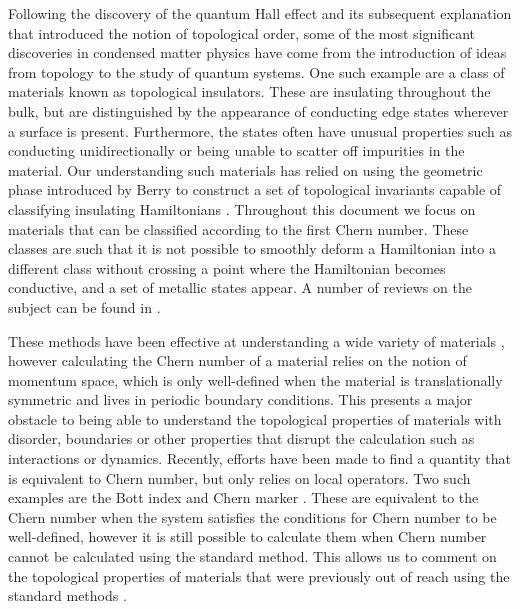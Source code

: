 
Following the discovery of the quantum Hall effect \cite{klitzing_new_1980} and its subsequent explanation \cite{laughlin_quantized_1981,thouless_quantized_1982} that introduced the notion of topological order, some of the most significant discoveries in condensed matter physics have come from the introduction of ideas from topology to the study of quantum systems. One such example are a class of materials known as topological insulators. These are insulating throughout the bulk, but are distinguished by the appearance of conducting edge states wherever a surface is present. Furthermore, the states often have unusual properties such as conducting unidirectionally or being unable to scatter off impurities in the material. Our understanding such materials has relied on using the geometric phase introduced by Berry \cite{berry_quantal_1984} to construct a set of topological invariants capable of classifying insulating Hamiltonians \cite{haldane_model_1988, bernevig_quantum_2006,kane_z_2005}. Throughout this document we focus on materials that can be classified according to the first Chern number. These classes are such that it is not possible to smoothly deform a Hamiltonian into a different class without crossing a point where the Hamiltonian becomes conductive, and a set of metallic states appear. A number of reviews on the subject can be found in \cite{hasan_topological_2010,qi_topological_2008,budich_adiabatic_2013}. \par
These methods have been effective at understanding a wide variety of materials \cite{chiu_classification_2016, cooper_topological_2019}, however calculating the Chern number of a material relies on the notion of momentum space, which is only well-defined when the material is translationally symmetric and lives in periodic boundary conditions. This presents a major obstacle to being able to understand the topological properties of materials with disorder, boundaries or other properties that disrupt the calculation such as interactions or dynamics. Recently, efforts have been made to find a quantity that is equivalent to Chern number, but only relies on local operators. Two such examples are the Bott index \cite{toniolo_equivalence_2017,loring_guide_2019} and Chern marker \cite{bianco_mapping_2011}. These are equivalent to the Chern number when the system satisfies the conditions for Chern number to be well-defined, however it is still possible to calculate them when Chern number cannot be calculated using the standard method. This allows us to comment on the topological properties of materials that were previously out of reach using the standard methods \cite{agarwala_topological_2017,huang_theory_2018,caio_topological_2019,toniolo_time-dependent_2018}. \par
